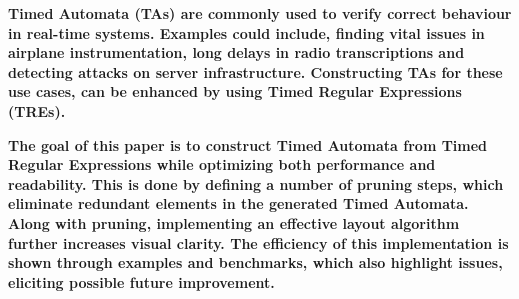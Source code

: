 \textbf{Timed Automata (TAs) are commonly used to verify correct behaviour in real-time systems. Examples could include, finding vital issues in airplane instrumentation, long delays in radio transcriptions and detecting attacks on server infrastructure. Constructing TAs for these use cases, can be enhanced by using Timed Regular Expressions (TREs).}

\textbf{The goal of this paper is to construct Timed Automata from Timed Regular Expressions while optimizing both performance and readability. This is done by defining a number of pruning steps, which eliminate redundant elements in the generated Timed Automata. Along with pruning, implementing an effective layout algorithm further increases visual clarity. The efficiency of this implementation is shown through examples and benchmarks, which also highlight issues, eliciting possible future improvement.}
